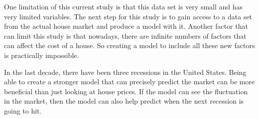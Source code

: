 \documentclass[12pt]{article}
\begin{document}
One limitation of this current study is that this data set is very small and has very limited variables. The next step for this study is to gain access to a data set from the actual house market and produce a model with it. Another factor that can limit this study is that nowadays, there are infinite numbers of factors that can affect the cost of a house. So creating a model to include all these new factors is practically impossible. 

In the last decade, there have been three recessions in the United States. Being able to create a stronger model that can precisely predict the market can be more beneficial than just looking at house prices. If the model can see the fluctuation in the market, then the model can also help predict when the next recession is going to hit. 




\medskip

\printbibliography[title={References}]
\end{document}
